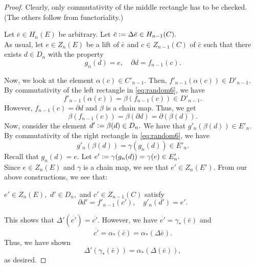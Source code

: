 \documentclass[12pt]{article}
\begin{document}
\begin{proof} 
	Clearly, only commutativity of the middle rectangle has to be checked. (The others follow from functoriality.)

	Let $\bar{e} \in H_n(E)$ be arbitrary. Let $\bar{c} \vcentcolon= \Delta\bar{e} \in H_{n-1}(C).$ \\
	As usual, let $e \in Z_n(E)$ be a lift of $\bar{e}$ and $c \in Z_{n-1}(C)$ of $\bar{c}$ such that there exists $d \in D_n$ with the property
	\begin{equation*} 
		g_n(d) = e, \quad \partial d = f_{n-1}(c).
	\end{equation*}

	Now, we look at the element $\alpha(c) \in C'_{n-1}.$ Then, $f'_{n-1}(\alpha(c)) \in D'_{n-1}.$\\
	By commutativity of the left rectangle in \cref{eq:random6}, we have
	\begin{equation*} 
		f'_{n-1}(\alpha(c)) = \beta(f_{n-1}(c)) \in D'_{n-1}.
	\end{equation*}
	However, $f_{n-1}(c) = \partial d$ and $\beta$ is a chain map. Thus, we get
	\begin{equation*} 
		\beta(f_{n-1}(c)) = \beta(\partial d) = \partial(\beta(d)).
	\end{equation*}
	Now, consider the element $d' \vcentcolon= \beta(d) \in D_n.$ We have that $g'_n(\beta(d)) \in E'_n.$ By commutativity of the right rectangle in \cref{eq:random6}, we have
	\begin{equation*} 
		g'_n(\beta(d)) = \gamma(g_n(d)) \in E'_n.
	\end{equation*}
	Recall that $g_n(d) = e.$ Let $e' \vcentcolon= \gamma(g_n(d)) = \gamma(e) \in E'_n.$\\
	Since $e \in Z_n(E)$ and $\gamma$ is a chain map, we see that $e' \in Z_n(E').$ From our above constructions, we see that:

	$e' \in Z_n(E),$ $d' \in D_n,$ and $c' \in Z_{n-1}(C)$ satisfy
	\begin{equation*} 
		\partial d' = f'_{n-1}(c'), \quad g'_n(d') = e'.
	\end{equation*}

	This shows that $\Delta'\left(\overline{e'}\right) = \overline{c'}.$ However, we have $\overline{e'} = \gamma_*(\bar{e})$ and
	\begin{equation*} 
		\overline{c'} = \alpha_*(\bar{c}) = \alpha_*(\Delta \bar{e}).
	\end{equation*} 
	Thus, we have shown
	\begin{equation*} 
		\Delta'(\gamma_*(\bar{e})) = \alpha_*(\Delta(\bar{e})),
	\end{equation*}
	as desired.
\end{proof}
\end{document}
